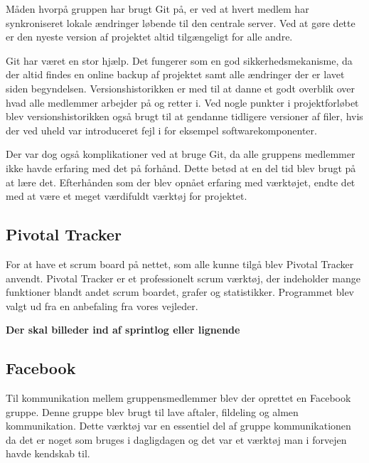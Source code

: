 \noindent Måden hvorpå gruppen har brugt Git på, er ved at hvert medlem har synkroniseret lokale ændringer løbende til den centrale server. Ved at gøre dette er den nyeste version af projektet altid tilgængeligt for alle andre. \newline

\noindent Git har været en stor hjælp. Det fungerer som en god sikkerhedsmekanisme, da der altid findes en online backup af projektet samt alle ændringer der er lavet siden begyndelsen. Versionshistorikken er med til at danne et godt overblik over hvad alle medlemmer arbejder på og retter i. Ved nogle punkter i projektforløbet blev versionshistorikken også brugt til at gendanne tidligere versioner af filer, hvis der ved uheld var introduceret fejl i for eksempel softwarekomponenter. \newline

\noindent Der var dog også komplikationer ved at bruge Git, da alle gruppens medlemmer ikke havde erfaring med det på forhånd. Dette betød at en del tid blev brugt på at lære det. Efterhånden som der blev opnået erfaring med værktøjet, endte det med at være et meget værdifuldt værktøj for projektet.  

\subsection{Pivotal Tracker}
For at have et scrum board på nettet, som alle kunne tilgå blev Pivotal Tracker anvendt. Pivotal Tracker er et professionelt scrum værktøj, der indeholder mange funktioner blandt andet scrum boardet, grafer og statistikker. Programmet blev valgt ud fra en anbefaling fra vores vejleder.

\textbf{Der skal billeder ind af sprintlog eller lignende} 

\subsection{Facebook}
Til kommunikation mellem gruppensmedlemmer blev der oprettet en Facebook gruppe. Denne gruppe blev brugt til lave aftaler, fildeling og almen kommunikation. Dette værktøj var en essentiel del af gruppe kommunikationen da det er noget som bruges i dagligdagen og det var et værktøj man i forvejen havde kendskab til. \newline

